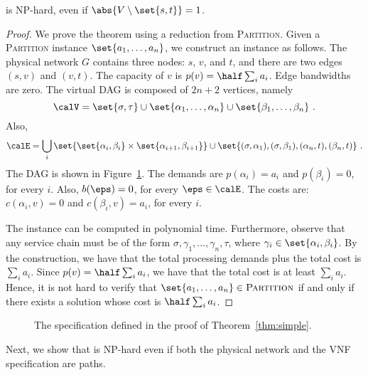 \begin{theorem}
\label{thm:simple}
\scp is NP-hard, even if $\abs{V \setminus \set{s,t}} = 1$.
\end{theorem}
\begin{proof}
We prove the theorem using a reduction from \textsc{Partition}.
Given a \textsc{Partition} instance $\set{a_1, \ldots, a_n}$, we
construct an \scp instance as follows.
%
The physical network $G$ contains three nodes: $s$, $v$, and $t$, and
there are two edges $(s,v)$ and $(v,t)$.  The capacity of $v$ is $p(v)
= \half \sum_i a_i$.  Edge bandwidths are zero.
%
The virtual DAG is composed of $2n+2$ vertices, namely
\[
\calV
= \set{\sigma,\tau}
  \cup \set{\alpha_1, \ldots, \alpha_n}
  \cup \set{\beta_1, \ldots, \beta_n}
~.
\]
Also,
\[
\calE
= \bigcup_i \set{ \set{\alpha_i,\beta_i} \times \set{\alpha_{i+1},\beta_{i+1}} } 
  \cup
  \set{ (\sigma,\alpha_1), (\sigma,\beta_1), (\alpha_n,t), (\beta_n,t) }
~.
\]
The DAG is shown in Figure~\ref{fig:simple}.
%
The demands are $p(\alpha_i) = a_i$ and $p(\beta_i) = 0$, for every
$i$.  Also, $b(\eps) = 0$, for every $\eps \in \calE$.  The costs are:
$c(\alpha_i,v) = 0$ and $c(\beta_i,v) = a_i$, for every $i$.

The \scp instance can be computed in polynomial time.
%
Furthermore, observe that any service chain must be of the form
$\sigma, \gamma_1, \ldots, \gamma_n, \tau$, where $\gamma_i \in
\set{\alpha_i,\beta_i}$.  By the construction, we have that the total
processing demands plus the total cost is $\sum_i a_i$.  Since $p(v) =
\half \sum_i a_i$, we have that the total cost is at least $\sum_i
a_i$.  Hence, it is not hard to verify that $\set{a_1, \ldots, a_n}
\in \textsc{Partition}$ if and only if there exists a solution whose
cost is $\half \sum_i a_i$.
\end{proof}

\begin{figure}[t]
  \centering
{}
\caption[\scp{} - Hardness (single node)]{The specification defined in the proof of Theorem~\ref{thm:simple}.}
\label{fig:simple}
\end{figure}

Next, we show that \scp is NP-hard even if both the physical network
and the VNF specification are paths.

